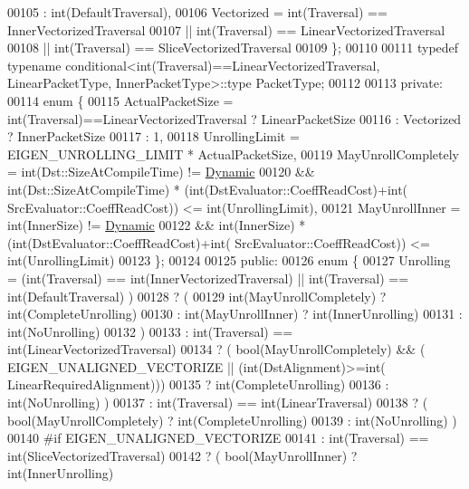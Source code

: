 \begin{DoxyCode}
00105                                          : int(DefaultTraversal),
00106     Vectorized = int(Traversal) == InnerVectorizedTraversal
00107               || int(Traversal) == LinearVectorizedTraversal
00108               || int(Traversal) == SliceVectorizedTraversal
00109   \};
00110 
00111   \textcolor{keyword}{typedef} \textcolor{keyword}{typename} conditional<int(Traversal)==LinearVectorizedTraversal, LinearPacketType,
       InnerPacketType>::type PacketType;
00112 
00113 \textcolor{keyword}{private}:
00114   \textcolor{keyword}{enum} \{
00115     ActualPacketSize    = int(Traversal)==LinearVectorizedTraversal ? LinearPacketSize
00116                         : Vectorized ? InnerPacketSize
00117                         : 1,
00118     UnrollingLimit      = EIGEN\_UNROLLING\_LIMIT * ActualPacketSize,
00119     MayUnrollCompletely = int(Dst::SizeAtCompileTime) != \hyperlink{namespace_eigen_ad81fa7195215a0ce30017dfac309f0b2}{Dynamic}
00120                        && int(Dst::SizeAtCompileTime) * (int(DstEvaluator::CoeffReadCost)+int(
      SrcEvaluator::CoeffReadCost)) <= \textcolor{keywordtype}{int}(UnrollingLimit),
00121     MayUnrollInner      = int(InnerSize) != \hyperlink{namespace_eigen_ad81fa7195215a0ce30017dfac309f0b2}{Dynamic}
00122                        && int(InnerSize) * (int(DstEvaluator::CoeffReadCost)+int(
      SrcEvaluator::CoeffReadCost)) <= \textcolor{keywordtype}{int}(UnrollingLimit)
00123   \};
00124 
00125 \textcolor{keyword}{public}:
00126   \textcolor{keyword}{enum} \{
00127     Unrolling = (int(Traversal) == int(InnerVectorizedTraversal) || int(Traversal) == int(DefaultTraversal)
      )
00128                 ? (
00129                     \textcolor{keywordtype}{int}(MayUnrollCompletely) ? int(CompleteUnrolling)
00130                   : int(MayUnrollInner)      ? int(InnerUnrolling)
00131                                              : int(NoUnrolling)
00132                   )
00133               : int(Traversal) == int(LinearVectorizedTraversal)
00134                 ? ( bool(MayUnrollCompletely) && ( EIGEN\_UNALIGNED\_VECTORIZE || (int(DstAlignment)>=int(
      LinearRequiredAlignment)))
00135                           ? int(CompleteUnrolling)
00136                           : int(NoUnrolling) )
00137               : int(Traversal) == int(LinearTraversal)
00138                 ? ( bool(MayUnrollCompletely) ? int(CompleteUnrolling) 
00139                                               : int(NoUnrolling) )
00140 #if EIGEN\_UNALIGNED\_VECTORIZE
00141               : int(Traversal) == int(SliceVectorizedTraversal)
00142                 ? ( bool(MayUnrollInner) ? int(InnerUnrolling)

\end{DoxyCode}
